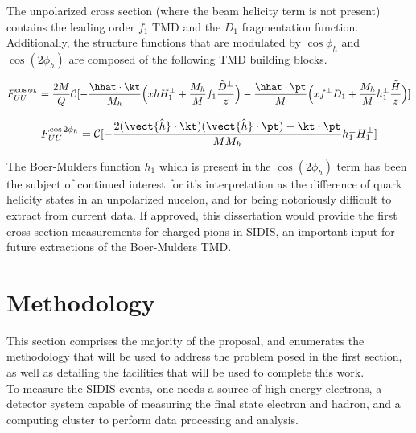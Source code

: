 The unpolarized cross section (where the beam helicity term is not present) contains the leading order $f_1$ TMD and the $D_1$ fragmentation function.  Additionally, the structure functions that are modulated by $\cos\phi_h$ and $\cos(2\phi_h)$ are composed of the following TMD building blocks.

\begin{equation}
F_{UU}^{\cos \phi_h} = \frac{2M}{Q} \mathcal{C}[ - \frac{\hhat \cdot \kt}{M_h} \Bigl( x h H_{1}^{\perp} + \frac{M_h}{M} f_1 \frac{\tilde{D}^{\perp}}{z} \Bigr) - \frac{\hhat \cdot \pt}{M} \Bigl( x f^{\perp} D_1 + \frac{M_h}{M} h_1^{\perp} \frac{\tilde{H}}{z} \Bigr)]
\end{equation}

\begin{equation}
F_{UU}^{\cos 2\phi_h} = \mathcal{C}[- \frac{2 (\vect{\hat{h}} \cdot \kt) (\vect{\hat{h}} \cdot \pt) - \kt \cdot \pt}{M M_h} h_{1}^{\perp} H_{1}^{\perp} ]
\end{equation}

The Boer-Mulders function $h_1$ which is present in the $\cos(2\phi_h)$ term has been the subject of continued interest for it's interpretation as the difference of quark helicity states in an unpolarized nucelon, and for being notoriously difficult to extract from current data.  If approved, this dissertation would provide the first cross section measurements for charged pions in SIDIS, an important input for future extractions of the Boer-Mulders TMD.  

%
%

\section{Methodology}
This section comprises the majority of the proposal, and enumerates the methodology that will be used to address the problem posed in the first section, as well as detailing the facilities that will be used to complete this work.  \\

To measure the SIDIS events, one needs a source of high energy electrons, a detector system capable of measuring the final state electron and hadron, and a computing cluster to perform data processing and analysis.


